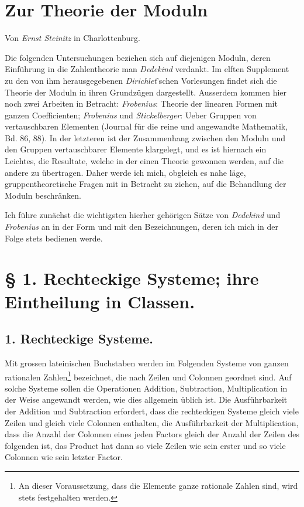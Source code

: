 \documentclass[11pt,a4paper]{article}
\begin{document}
\section*{Zur Theorie der Moduln}
\begin{center}
Von \emph{Ernst Steinitz} in Charlottenburg.
\end{center}

Die folgenden Untersuchungen beziehen sich auf diejenigen Moduln, deren Einführung in die Zahlentheorie man \emph{Dedekind} verdankt. Im elften Supplement zu den von ihm herausgegebenen \emph{Dirichlet}'schen Vorlesungen findet sich die Theorie der Moduln in ihren Grundzügen dargestellt. Ausserdem kommen hier noch zwei Arbeiten in Betracht: \emph{Frobenius}: Theorie der linearen Formen mit ganzen Coefficienten; \emph{Frobenius} und \emph{Stickelberger}: Ueber Gruppen von vertauschbaren Elementen (Journal für die reine und angewandte Mathematik, Bd. 86, 88). In der letzteren ist der Zusammenhang zwischen den Moduln und den Gruppen vertauschbarer Elemente klargelegt, und es ist hiernach ein Leichtes, die Resultate, welche in der einen Theorie gewonnen werden, auf die andere zu übertragen. Daher werde ich mich, obgleich es nahe läge, gruppentheoretische Fragen mit in Betracht zu ziehen, auf die Behandlung der Moduln beschränken.

Ich führe zunächst die wichtigsten hierher gehörigen Sätze von \emph{Dedekind} und \emph{Frobenius} an in der Form und mit den Bezeichnungen, deren ich mich in der Folge stets bedienen werde.

\section*{§ 1. Rechteckige Systeme; ihre Eintheilung in Classen.}

\subsection*{1. Rechteckige Systeme.}

Mit grossen lateinischen Buchstaben werden im Folgenden Systeme von ganzen rationalen Zahlen\footnote{An dieser Voraussetzung, dass die Elemente ganze rationale Zahlen sind, wird stets festgehalten werden.} bezeichnet, die nach Zeilen und Colonnen geordnet sind. Auf solche Systeme sollen die Operationen Addition, Subtraction, Multiplication in der Weise angewandt werden, wie dies allgemein üblich ist. Die Ausführbarkeit der Addition und Subtraction erfordert, dass die rechteckigen Systeme gleich viele Zeilen und gleich viele Colonnen enthalten, die Ausführbarkeit der Multiplication, dass die Anzahl der Colonnen eines jeden Factors gleich der Anzahl der Zeilen des folgenden ist, das Product hat dann so viele Zeilen wie sein erster und so viele Colonnen wie sein letzter Factor.
\end{document}
